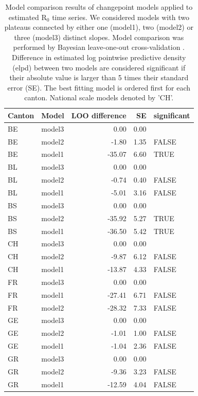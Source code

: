\begin{table}[!htb]
    \centering
    \caption[Model comparison results of changepoint models of R$_0$ time series]{Model comparison results of changepoint models applied to estimated R$_0$ time series. We considered models with two plateaus connected by either one (model1), two (model2) or three (model3) distinct slopes. Model comparison was performed by Bayesian leave-one-out cross-validation \parencite{vehtari_practical_2017}. Difference in estimated log pointwise predictive density (elpd) between two models are considered significant if their absolute value is larger than 5 times their standard error (SE). The best fitting model is ordered first for each canton. National scale models denoted by 'CH'.}
    \label{tab:chgpnt}
    \footnotesize
\begin{tabular}{llrrl}
\toprule
Canton & Model & LOO difference & SE & significant\\
\midrule
BE & model3 & 0.00 & 0.00 & \\
BE & model2 & -1.80 & 1.35 & FALSE\\
BE & model1 & -35.07 & 6.60 & TRUE\\
\addlinespace
BL & model3 & 0.00 & 0.00 & \\
BL & model2 & -0.74 & 0.40 & FALSE\\
BL & model1 & -5.01 & 3.16 & FALSE\\
\addlinespace
BS & model3 & 0.00 & 0.00 & \\
BS & model2 & -35.92 & 5.27 & TRUE\\
BS & model1 & -36.50 & 5.42 & TRUE\\
\addlinespace
CH & model3 & 0.00 & 0.00 & \\
CH & model2 & -9.87 & 6.12 & FALSE\\
CH & model1 & -13.87 & 4.33 & FALSE\\
\addlinespace
FR & model3 & 0.00 & 0.00 & \\
FR & model1 & -27.41 & 6.71 & FALSE\\
FR & model2 & -28.32 & 7.33 & FALSE\\
\addlinespace
GE & model3 & 0.00 & 0.00 & \\
GE & model2 & -1.01 & 1.00 & FALSE\\
GE & model1 & -1.04 & 2.36 & FALSE\\
\addlinespace
GR & model3 & 0.00 & 0.00 & \\
GR & model2 & -9.36 & 3.23 & FALSE\\
GR & model1 & -12.59 & 4.04 & FALSE\\

\end{tabular}
\end{table}
